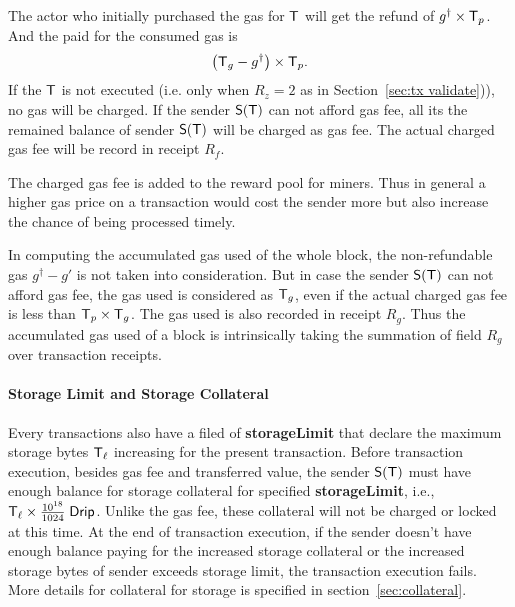 The actor who initially purchased the gas for $\textsf{T}$ will get the refund of $g^{\dagger}\times\textsf{T}_p$. And the \coinsign paid for the consumed gas is 
%
\begin{align}
	\left(\textsf{T}_g-g^{\dagger}\right)\times \textsf{T}_p.
\end{align}
%
If the $\textsf{T}$ is not executed (i.e. only when $R_z=2$ as in Section~\ref{sec:tx validate})), no gas will be charged. If the sender $\mathsf{S}{\left({\textsf{T}} \right)}$ can not afford gas fee, all its the remained balance of sender $\mathsf{S}{\left({\textsf{T}} \right)}$ will be charged as gas fee. The actual charged gas fee will be record in receipt $R_f$. 

	
The charged gas fee is added to the reward pool for miners. Thus in general a higher gas price on a transaction would cost the sender more but also increase the chance of being processed timely.

In computing the accumulated gas used of the whole block, the non-refundable gas $g^{\dagger} - g'$ is not taken into consideration. But in case the sender $\mathsf{S}{\left({\textsf{T}} \right)}$ can not afford gas fee, the gas used is considered as $\textsf{T}_g$, even if the actual charged gas fee is less than $\textsf{T}_p\times\textsf{T}_g$. The gas used is also recorded in receipt $R_g$. 
%
Thus the accumulated gas used of a block is intrinsically taking the summation of field $R_g$ over transaction receipts.

\paragraph{Storage Limit and Storage Collateral}

Every transactions also have a filed of \textbf{storageLimit} that declare the maximum storage bytes $\textsf{T}_\ell$ increasing for the present transaction. Before transaction execution, besides gas fee and transferred value, the sender $\mathsf{S}{\left({\textsf{T}} \right)}$ must have enough balance for storage collateral for specified \textbf{storageLimit}, i.e., $\textsf{T}_\ell\times\frac{10^{18}}{1024}\;{\sf Drip}$. Unlike the gas fee, these collateral will not be charged or locked at this time. At the end of transaction execution, if the sender doesn't have enough balance paying for the increased storage collateral or the increased storage bytes of sender exceeds storage limit, the transaction execution fails. More details for collateral for storage is specified in section~\ref{sec:collateral}. 

